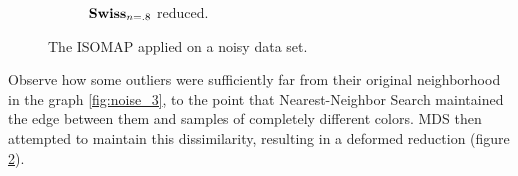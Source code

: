 \begin{description}
\begin{figure}[H]
\begin{subfigure}{.45\linewidth}
			\captionsetup{justification=centering}
			\caption{$\mathbf{Swiss}_{n=.8}$ reduced.}
			\label{fig:noise_2}
		\end{subfigure}
		\captionsetup{justification=centering}
		\caption{The ISOMAP applied on a noisy data set.}
	\end{figure}

	Observe how some outliers were sufficiently far from their original neighborhood in the graph \ref{fig:noise_3}, to the point that Nearest-Neighbor Search maintained the edge between them and samples of completely different colors. MDS then attempted to maintain this dissimilarity, resulting in a deformed reduction (figure \ref{fig:noise_2}).
\end{description}
